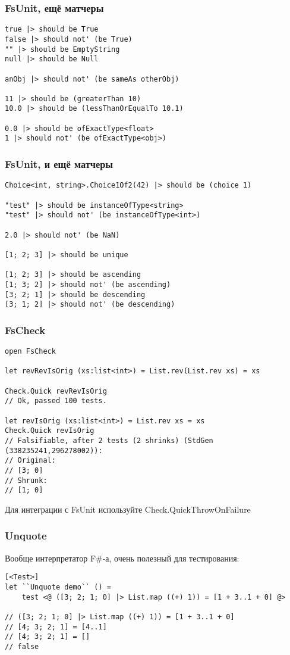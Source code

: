 \documentclass{../../slides-style}
\begin{document}
    \begin{frame}[fragile]
        \frametitle{FsUnit, ещё матчеры}
        \begin{verbatim}
true |> should be True
false |> should not' (be True)
"" |> should be EmptyString
null |> should be Null

anObj |> should not' (be sameAs otherObj)

11 |> should be (greaterThan 10)
10.0 |> should be (lessThanOrEqualTo 10.1)

0.0 |> should be ofExactType<float>
1 |> should not' (be ofExactType<obj>)
        \end{verbatim}
    \end{frame}

    \begin{frame}[fragile]
        \frametitle{FsUnit, и ещё матчеры}
        \begin{verbatim}
Choice<int, string>.Choice1Of2(42) |> should be (choice 1)

"test" |> should be instanceOfType<string>
"test" |> should not' (be instanceOfType<int>)

2.0 |> should not' (be NaN)

[1; 2; 3] |> should be unique

[1; 2; 3] |> should be ascending
[1; 3; 2] |> should not' (be ascending)
[3; 2; 1] |> should be descending
[3; 1; 2] |> should not' (be descending)
        \end{verbatim}
    \end{frame}

    \begin{frame}[fragile]
        \frametitle{FsCheck}
        \begin{verbatim}
open FsCheck

let revRevIsOrig (xs:list<int>) = List.rev(List.rev xs) = xs

Check.Quick revRevIsOrig
// Ok, passed 100 tests.

let revIsOrig (xs:list<int>) = List.rev xs = xs
Check.Quick revIsOrig
// Falsifiable, after 2 tests (2 shrinks) (StdGen (338235241,296278002)):
// Original:
// [3; 0]
// Shrunk:
// [1; 0]
        \end{verbatim}
        Для интеграции с FsUnit используйте Check.QuickThrowOnFailure
    \end{frame}

    \begin{frame}[fragile]
        \frametitle{Unquote}
        Вообще интерпретатор F\#-а, очень полезный для тестирования:
        \begin{verbatim}
[<Test>]
let ``Unquote demo`` () =
    test <@ ([3; 2; 1; 0] |> List.map ((+) 1)) = [1 + 3..1 + 0] @>

// ([3; 2; 1; 0] |> List.map ((+) 1)) = [1 + 3..1 + 0]
// [4; 3; 2; 1] = [4..1]
// [4; 3; 2; 1] = []
// false
        \end{verbatim}
    \end{frame}
\end{document}
